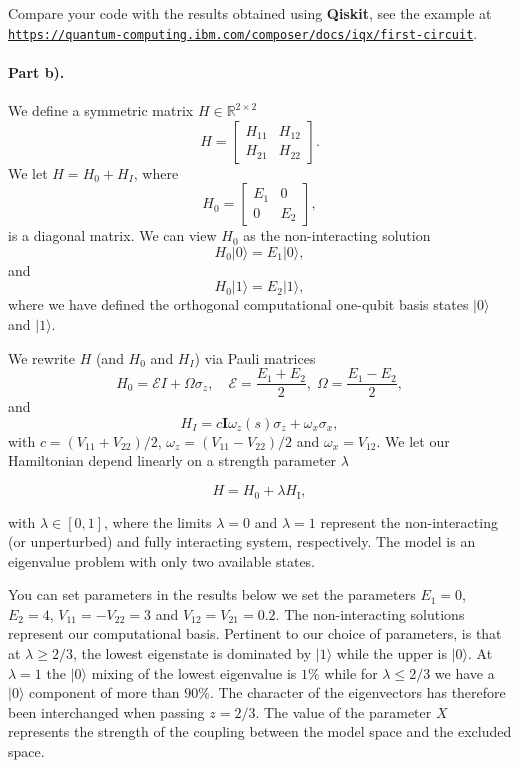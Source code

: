 \documentclass[%
oneside,                 %
final,                   %
10pt]{article}
\begin{document}
Compare your code with the results obtained using \textbf{Qiskit}, see the
example at
\href{{https://quantum-computing.ibm.com/composer/docs/iqx/first-circuit}}{\nolinkurl{https://quantum-computing.ibm.com/composer/docs/iqx/first-circuit}}.

\paragraph{Part b).}
We define a  symmetric matrix  $H\in {\mathbb{R}}^{2\times 2}$
\[
H = \begin{bmatrix} H_{11} & H_{12} \\ H_{21} & H_{22}
\end{bmatrix}.
\]
We  let $H = H_0 + H_I$, where
\[
H_0= \begin{bmatrix} E_1 & 0 \\ 0 & E_2\end{bmatrix},
\]
is a diagonal matrix. 
We can view $H_0$ as the non-interacting solution
\begin{equation}
       H_0\vert 0 \rangle =E_1\vert 0 \rangle,
\end{equation}
and
\begin{equation}
       H_0\vert 1\rangle =E_2\vert 1\rangle,
\end{equation}
where we have defined the orthogonal computational one-qubit basis states $\vert 0\rangle$ and $\vert 1\rangle$.

We rewrite $H$ (and $H_0$ and $H_I$)  via Pauli matrices
\[
H_0 = \mathcal{E} I + \Omega \sigma_z, \quad \mathcal{E} = \frac{E_1
  + E_2}{2}, \; \Omega = \frac{E_1-E_2}{2},
\]
and
\[
H_I = c \bm{I} \omega_z(s)\sigma_z + \omega_x\sigma_x,
\]
with $c = (V_{11}+V_{22})/2$, $\omega_z = (V_{11}-V_{22})/2$ and $\omega_x = V_12$.
We let our Hamiltonian depend linearly on a strength parameter $\lambda$

\[
H=H_0+\lambda H_\mathrm{I},
\]

with $\lambda \in [0,1]$, where the limits $\lambda=0$ and $\lambda=1$
represent the non-interacting (or unperturbed) and fully interacting
system, respectively.  The model is an eigenvalue problem with only
two available states.

You can set parameters 
in the results below we set the parameters $E_1=0$,
$E_2=4$, $V_{11}=-V_{22}=3$ and $V_{12}=V_{21}=0.2$.
The
non-interacting solutions represent our computational basis.
Pertinent to our choice of parameters, is that at $\lambda\geq 2/3$,
the lowest eigenstate is dominated by $\vert 1\rangle$ while the upper
is $\vert 0 \rangle$. At $\lambda=1$ the $\vert 0 \rangle$ mixing of
the lowest eigenvalue is $1\%$ while for $\lambda\leq 2/3$ we have a
$\vert 0 \rangle$ component of more than $90\%$.  The character of the
eigenvectors has therefore been interchanged when passing $z=2/3$. The
value of the parameter $X$ represents the strength of the coupling
between the model space and the excluded space.
\end{document}
